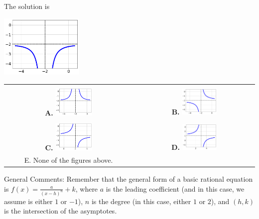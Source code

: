 \documentclass{article}[14pt]
\begin{document}
 
 The solution is  
 \begin{center} \includegraphics[width=0.3\textwidth]{../Figures/rationalEquationToGraphBE.png} \end{center}\begin{tabular}{|c|c|} 
\hline 
 & \tabularnewline 
 \textbf{A.} \includegraphics[width=0.3\textwidth]{../Figures/rationalEquationToGraphBA.png} & \textbf{B.} \includegraphics[width=0.3\textwidth]{../Figures/rationalEquationToGraphBB.png} \tabularnewline 
\hline 
 & \tabularnewline 
 \textbf{C.} \includegraphics[width=0.3\textwidth]{../Figures/rationalEquationToGraphBC.png} & \textbf{D.} \includegraphics[width=0.3\textwidth]{../Figures/rationalEquationToGraphBD.png} \tabularnewline 
\hline 
 E. None of the figures above. & \tabularnewline 
\hline 
 \end{tabular} 
 
General Comments: Remember that the general form of a basic rational equation is $ f(x) = \frac{a}{(x-h)^n} + k$, where $a$ is the leading coefficient (and in this case, we assume is either $1$ or $-1$), $n$ is the degree (in this case, either $1$ or $2$), and $(h, k)$ is the intersection of the asymptotes.
\end{document}
